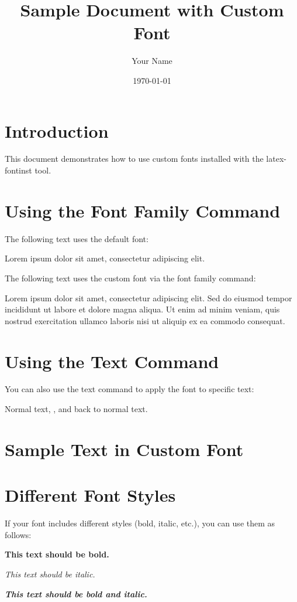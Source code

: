 \documentclass{article}
\title{Sample Document with Custom Font}
\author{Your Name}
\date{\today}
\begin{document}
\maketitle

\section{Introduction}

This document demonstrates how to use custom fonts installed with the latex-fontinst tool.

\section{Using the Font Family Command}

The following text uses the default font:

Lorem ipsum dolor sit amet, consectetur adipiscing elit.

\bigskip

The following text uses the custom font via the font family command:

{
Lorem ipsum dolor sit amet, consectetur adipiscing elit. Sed do eiusmod tempor 
incididunt ut labore et dolore magna aliqua. Ut enim ad minim veniam, quis nostrud 
exercitation ullamco laboris nisi ut aliquip ex ea commodo consequat.
}

\section{Using the Text Command}

You can also use the text command to apply the font to specific text:

Normal text, , and back to normal text.

\section{Sample Text in Custom Font}

{\fontname
\lipsum[1-2]
}

\section{Different Font Styles}

If your font includes different styles (bold, italic, etc.), you can use them as follows:

{\fontname
\textbf{This text should be bold.}

\textit{This text should be italic.}

\textbf{\textit{This text should be bold and italic.}}
}
\end{document}
